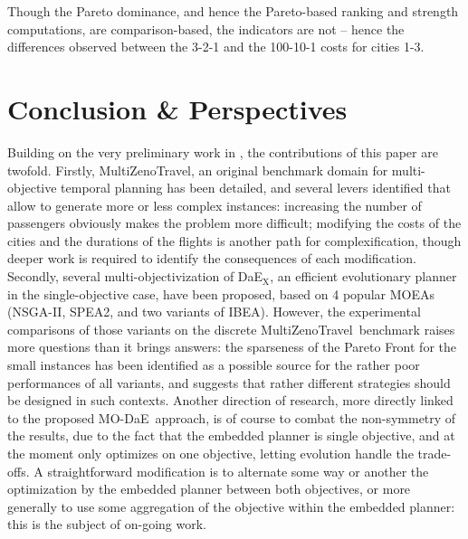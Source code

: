 \documentclass[a4paper,10pt]{article}
\def\DAEX{{\sc DaE$_{\text{X}}$}}
\def\MODAE{{\sc MO-DaE}}
\def\MULTIZENO{{\sc MultiZenoTravel}}
\begin{document}
Though the Pareto dominance, and hence the Pareto-based ranking and strength computations, are comparison-based, the indicators are not -- hence the differences observed between the 3-2-1 and the 100-10-1 costs for cities 1-3. 

 



\section{Conclusion \& Perspectives}
\label{sec:conclusion}
Building on the very preliminary work in \cite{Schoenauer2006}, the contributions of this paper are twofold. Firstly, \MULTIZENO, an original benchmark domain for multi-objective temporal planning has been detailed, and several levers identified that allow to generate more or less complex instances: increasing the number of passengers obviously makes the problem more difficult; modifying the costs of the cities and the durations of the flights is another path for complexification, though deeper work is required to identify the consequences of each modification.
Secondly, several multi-objectivization of \DAEX, an efficient evolutionary planner in the single-objective case, have been proposed, based on 4 popular MOEAs (NSGA-II, SPEA2, and two variants of IBEA).
However, the experimental comparisons of those variants on the discrete \MULTIZENO\ benchmark raises more questions than it brings answers: the sparseness of the Pareto Front for the small instances has been identified as a possible source for the rather poor performances of all variants, and suggests that rather different strategies should be designed in such contexts. Another direction of research, more directly linked to the proposed \MODAE\ approach,  is of course to combat the non-symmetry of the results, due to the fact that the embedded planner is single objective, and at the moment only optimizes on one objective, letting evolution handle the trade-offs. A straightforward modification is to alternate some way or another the optimization by the embedded planner between both objectives, or more generally to use some aggregation of the objective within the embedded planner: this is the subject of on-going work. 

 
 
\end{document}
